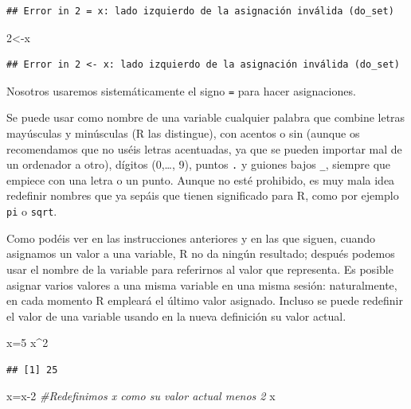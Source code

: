 \documentclass[]{book}
\newenvironment{Shaded}{\begin{snugshade}}{\end{snugshade}}
\newcommand{\CommentTok}[1]{\textcolor[rgb]{0.56,0.35,0.01}{\textit{#1}}}
\newcommand{\DecValTok}[1]{\textcolor[rgb]{0.00,0.00,0.81}{#1}}
\newcommand{\NormalTok}[1]{#1}
\newcommand{\OperatorTok}[1]{\textcolor[rgb]{0.81,0.36,0.00}{\textbf{#1}}}
\theoremstyle{definition}
\theoremstyle{definition}
\theoremstyle{definition}
\theoremstyle{remark}
\begin{document}
\begin{verbatim}
## Error in 2 = x: lado izquierdo de la asignación inválida (do_set)
\end{verbatim}

\begin{Shaded}
\begin{Highlighting}[]
\DecValTok{2}\NormalTok{<-x}
\end{Highlighting}
\end{Shaded}

\begin{verbatim}
## Error in 2 <- x: lado izquierdo de la asignación inválida (do_set)
\end{verbatim}

Nosotros usaremos sistemáticamente el signo \texttt{=} para hacer asignaciones.

Se puede usar como nombre de una variable cualquier palabra que combine letras mayúsculas y minúsculas (R las distingue), con acentos o sin (aunque os recomendamos que no uséis letras acentuadas, ya que se pueden importar mal de un ordenador a otro), dígitos (0,\ldots{}, 9), puntos \texttt{.} y guiones bajos \texttt{\_}, siempre que empiece con una letra o un punto. Aunque no esté prohibido, es muy mala idea redefinir nombres que ya sepáis que tienen significado para R, como por ejemplo \texttt{pi} o \texttt{sqrt}.

Como podéis ver en las instrucciones anteriores y en las que siguen, cuando asignamos un valor a una variable, R no da ningún resultado; después podemos usar el nombre de la variable para referirnos al valor que representa.
Es posible asignar varios valores a una misma variable en una misma sesión: naturalmente, en cada momento R empleará el último valor asignado. Incluso se puede redefinir el valor de una variable usando en la nueva definición su valor actual.

\begin{Shaded}
\begin{Highlighting}[]
\NormalTok{x=}\DecValTok{5}
\NormalTok{x}\OperatorTok{^}\DecValTok{2}
\end{Highlighting}
\end{Shaded}

\begin{verbatim}
## [1] 25
\end{verbatim}

\begin{Shaded}
\begin{Highlighting}[]
\NormalTok{x=x}\DecValTok{-2} \CommentTok{#Redefinimos x como su valor actual menos 2}
\NormalTok{x}
\end{Highlighting}
\end{Shaded}
\end{document}
